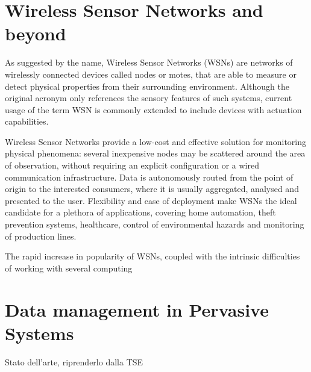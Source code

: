 \section{Wireless Sensor Networks and beyond} As suggested by the name,
Wireless Sensor Networks (WSNs) are networks of wirelessly connected devices
called nodes or motes, that are able to measure or detect physical properties
from their surrounding environment. Although the original acronym only
references the sensory features of such systems, current usage of the term WSN
is commonly extended to include devices with actuation capabilities.

Wireless Sensor Networks provide a low-cost and effective solution for
monitoring physical phenomena: several inexpensive nodes may be scattered
around the area of observation, without requiring an explicit configuration or
a wired communication infrastructure. Data is autonomously routed from the
point of origin to the interested consumers, where it is usually aggregated,
analysed and presented to the user. Flexibility and ease of deployment make
WSNs the ideal candidate for a plethora of applications, covering home
automation, theft prevention systems, healthcare, control of environmental
hazards and monitoring of production lines.

The rapid increase in popularity of WSNs, coupled with the intrinsic
difficulties of working with several computing 



\section{Data management in Pervasive Systems}

Stato dell'arte, riprenderlo dalla TSE
